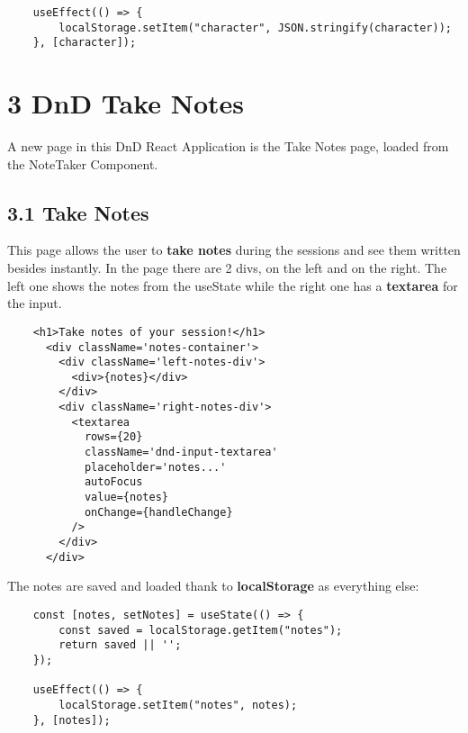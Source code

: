 \documentclass[
]{article}
\begin{document}
\begin{flushleft}
\begin{verbatim}
    useEffect(() => {
        localStorage.setItem("character", JSON.stringify(character));
    }, [character]);
\end{verbatim}

\newpage
\section{3 DnD Take Notes}\label{takenotes}

A new page in this DnD React Application is the Take Notes page, loaded from the NoteTaker Component.

\subsection{3.1 Take Notes}\label{notes}

This page allows the user to \textbf{take notes} during the sessions and see them written besides instantly.
In the page there are 2 divs, on the left and on the right.
The left one shows the notes from the useState while the right one has a \textbf{textarea} for the input.

\begin{verbatim}
    <h1>Take notes of your session!</h1>
      <div className='notes-container'>
        <div className='left-notes-div'>
          <div>{notes}</div>
        </div>
        <div className='right-notes-div'>
          <textarea
            rows={20}
            className='dnd-input-textarea'
            placeholder='notes...'
            autoFocus
            value={notes}
            onChange={handleChange}
          />
        </div>
      </div>
\end{verbatim}

The notes are saved and loaded thank to \textbf{localStorage} as everything else:

\begin{verbatim}
    const [notes, setNotes] = useState(() => {
        const saved = localStorage.getItem("notes");
        return saved || '';
    });

    useEffect(() => {
        localStorage.setItem("notes", notes);
    }, [notes]);
\end{verbatim}

\end{flushleft}
\end{document}
